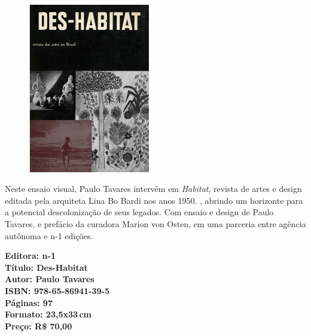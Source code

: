 \pagestyle{n-1}
\label{n-1}

\pagebreak


\begin{center}
\hspace*{.5cm}\includegraphics[width=74mm]{./CAPAS/N-1_HABITAT.jpg}
\end{center}

\hspace*{-7cm}\hrulefill\hspace*{-7cm}

\medskip

\noindent{}Neste ensaio visual, Paulo Tavares intervém em \textit{Habitat}, revista de artes e design editada pela arquiteta Lina Bo Bardi nos anos 1950. , abrindo um horizonte para a potencial descolonização de seus legados. Com ensaio e design de Paulo Tavares, e prefácio da curadora Marion von Osten, em uma parceria entre agência autônoma e n-1 edições.

\vfill

\hspace*{-.4cm}\begin{minipage}[c]{1\linewidth}
\small\textbf{
\hspace*{-.1cm}Editora: n-1\\
Título: Des-Habitat\\
Autor: Paulo Tavares\\ 
ISBN: 978-65-86941-39-5\\
Páginas: 97\\
Formato: 23,5x33\,cm\\
Preço: R\$ 70,00\\
}
\end{minipage}

